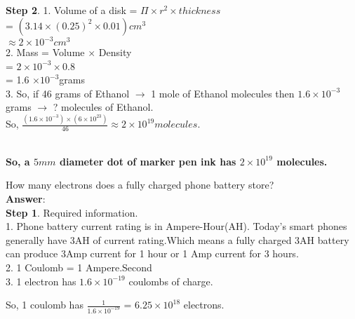 \documentclass[11pt]{exam}
\begin{document}
\begin{questions}
{\begin{minipage}{38em}
\textbf{Step 2}. 
1. Volume of a disk = $\Pi \times r^{2} \times thickness$ \\
                               = $(3.14 \times (0.25)^{2} \times 0.01 ) cm^{3} $ \\
                              $\approx 2\times10^{-3} cm^{3}$ \\

2. Mass	= Volume $\times$ Density \\
 		= $2 \times 10^{-3} \times 0.8$ \\
    		= 1.6 $\times 10^{-3} $grams \\ 

3. So, if 46 grams of Ethanol $\rightarrow$ 1 mole of Ethanol molecules then $1.6 \times10^{-3}$  grams $\rightarrow$ ? molecules of Ethanol.\\

So, $\frac{(1.6\times10^{-3}) \times (6\times10^{23})}{46} \approx 2\times10^{19} molecules$. \\  
\end{minipage}} \\  

\textbf{So, a $5mm$ diameter dot of marker pen ink has $2\times10^{19}$ molecules.}  \\
                       
 
 
\question
\label{Q8:Phone battery}

How many electrons does a fully charged phone battery store? \\
\textbf{Answer}: \\
\textbf{Step 1}. Required information. \\

1. Phone battery current rating is in Ampere-Hour(AH). Today's smart phones generally have 3AH of current rating.Which means a fully charged 3AH battery can produce 3Amp current for 1 hour or 1 Amp current for 3 hours. \\

2. 1 Coulomb = 1 Ampere.Second \\
              
3. 1 electron has $1.6 \times 10^{-19}$ coulombs of charge.   
              
 So, 1 coulomb has $\frac{1}{1.6 \times10^{-19}}$ = $6.25 \times 10^{18}$ electrons. \\   
                                               

\end{questions}
\end{document}
